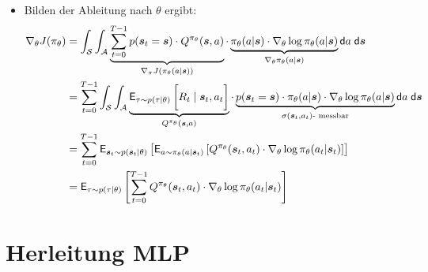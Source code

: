 \documentclass[a4paper, 12pt]{scrartcl}
\begin{document}
\begin{beweis}
\begin{itemize}
        \item Bilden der Ableitung nach $\theta$ ergibt:
        \begin{align*}
            \nabla_{\theta} J(\pi_{\theta}) 
            &=
            \int_{\mathcal{S}} \int_{\mathcal{A}}
            \underbrace{
                \sum_{t=0}^{T-1} p(\bm{s}_t = \bm{s}) \cdot
                Q^{\pi_{\theta}}(\bm{s},a)
                }_{
                    \nabla_{\pi} J(\pi_{\theta}(a | \bm{s}))
                }
            \cdot
            \underbrace{
                \pi_{\theta}(a|\bm{s}) 
                \cdot \nabla_{\theta} \log \pi_{\theta}(a|\bm{s})
            }_{
                \nabla_{\theta} \pi_{\theta}(a|\bm{s})
            }
            \mathsf{d}a \; \mathsf{d}\bm{s} \\
            &=
            \sum_{t=0}^{T-1}
            \int_{\mathcal{S}} 
            \int_{\mathcal{A}}
            \underbrace{
                \mathsf{E}_{\tau \sim p(\tau|\theta)}
                \left[
                    \vphantom{\int}
                    R_t \mid \bm{s}_t, a_t 
                \right]
            }_{
                Q^{\pi_{\theta}}(\bm{s},a)
            }
            \cdot
            \underbrace{
                p(\bm{s}_t = \bm{s}) \cdot
                \pi_{\theta}(a|\bm{s}) 
                \cdot \nabla_{\theta} \log \pi_{\theta}(a|\bm{s})
            }_{
                \sigma(\bm{s}_t, a_t)\text{- messbar}
            }
            \mathsf{d}a \; \mathsf{d}\bm{s} \\
            &=
            \sum_{t=0}^{T-1}
            \mathsf{E}_{\bm{s}_t \sim p(\bm{s}_t|\theta)}
                \left[
                    \mathsf{E}_{a \sim \pi_{\theta}(a|\bm{s}_t)}
                    \left[
                        Q^{\pi_{\theta}}(\bm{s}_t, a_t)
                        \cdot
                        \nabla_{\theta} \log \pi_{\theta}(a_t|\bm{s}_t)
                    \right]
                \right]
                \\
            &=
            \mathsf{E}_{\tau \sim p(\tau|\theta)} 
            \left[ 
                \sum_{t=0}^{T-1} 
                Q^{\pi_{\theta}}(\bm{s}_t, a_t) \cdot
                \nabla_{\theta} \log \pi_{\theta}(a_t|\bm{s}_t)
            \right]
        \end{align*}
    \end{itemize}
\end{beweis}

\section{Herleitung MLP}
\end{document}
